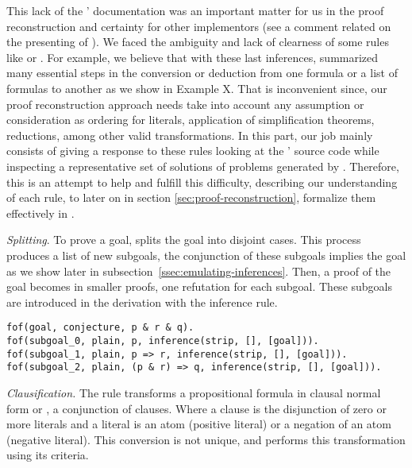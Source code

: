 \documentclass[../main.tex]{subfiles}
\begin{document}
This lack of the \Metis' documentation was an important matter for us in the
proof reconstruction and certainty for other implementors (see a comment
related on the presenting of 
).
We faced the ambiguity and lack of clearness of some rules like \canonicalize
or \simplify. For example, we believe that with these last inferences, \Metis
summarized many essential steps in the conversion or deduction from one formula
or a list of formulas to another as we show in Example X.
That is inconvenient since, our proof reconstruction approach needs take into
account any assumption or consideration as ordering for literals, application
of simplification theorems, reductions, among other valid transformations.
In this part, our job mainly consists of giving
a response to these rules looking at the \Metis' source code while inspecting
a representative set of solutions of \CPL problems generated by \Metis.
Therefore, this is an attempt to help and fulfill this difficulty, describing
our understanding of each rule, to later on in section
\ref{sec:proof-reconstruction}, formalize them effectively in \Agda.


\textit{Splitting}.
To prove a goal, \Metis splits the goal into disjoint cases. This
process produces a list of new subgoals, the conjunction of these subgoals
implies the goal as we show later in subsection~\ref{ssec:emulating-inferences}.
Then, a proof of the goal becomes in smaller proofs, one
refutation for each subgoal. These subgoals are introduced in the \TSTP
derivation with the \strip inference rule.

\begin{verbatim}
fof(goal, conjecture, p & r & q).
fof(subgoal_0, plain, p, inference(strip, [], [goal])).
fof(subgoal_1, plain, p => r, inference(strip, [], [goal])).
fof(subgoal_2, plain, (p & r) => q, inference(strip, [], [goal])).
\end{verbatim}


\textit{Clausification.} The \clausify rule transforms a
propositional formula in clausal normal form or \CNF,
a conjunction of clauses. Where a clause is the disjunction of zero or
more literals and a literal is an atom (positive literal) or a negation of an
atom (negative literal). This conversion is not unique, and \Metis performs
this transformation using its criteria.
\end{document}
